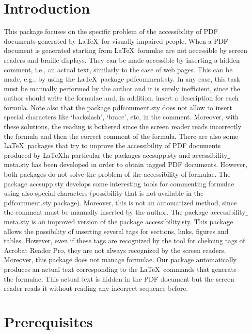 \documentclass[11pt,a4paper]{article}
\begin{document}
\section{Introduction}
This package focuses on the specific problem of the accessibility of PDF documents generated by \LaTeX\ for visually impaired people.
When a PDF document is generated starting from \LaTeX\, formulae are not accessible by screen readers and braille displays. They can be made accessible by inserting a hidden comment, i.e., an actual text, similarly to the case of web pages. This can be made, e.g., by using the \LaTeX\ package pdfcomment.sty. In any case, this task must be manually performed by the author and it is surely inefficient, since the author should write the formulae and, in addition, insert a description for each formula. Note also that the package pdfcomment.sty does not allow to insert special characters like `backslash', `brace', etc, in the comment. Moreover, with these solutions, the reading is bothered since the screen reader reads incorrectly the formula and then the correct comment of the formula. There are also some \LaTeX\ packages that try to improve the accessibility of PDF documents produced by \LaTeX\. In particular the packages accsupp.sty and accessibility$\_$meta.sty has been developed in order to obtain tagged PDF documents. However, both packages do not solve the problem of the accessibility of formulae. The package accsupp.sty develops some interesting tools for commenting formulae using also special characters (possibility that is not available in the pdfcomment.sty package). Moreover, this is not an automatized method, since the comment must be manually inserted by the author. The package accessibility$\_$meta.sty is an improved version of the package accessibility.sty. This package allows the possibility of inserting several tags for sections, links, figures and tables. However, even if these tags are recognized by the tool for chekcing tags of Acrobat Reader Pro, they are not always recognized by the screen readers. Moreover, this package does not manage formulae. Our package automatically produces an actual text corresponding to the \LaTeX\ commands that generate the formulae. This actual text is hidden in the PDF document but the screen reader reads it without reading  any incorrect sequence before. 


\section{Prerequisites}
\end{document}
